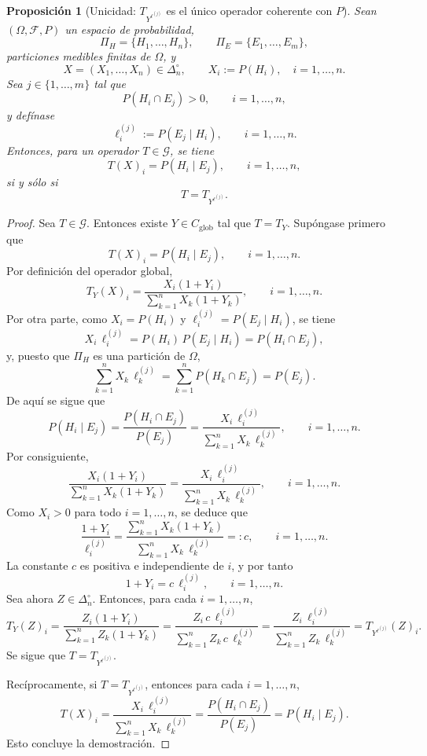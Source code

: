 \documentclass[12pt]{article}
\newtheorem{proposicion}{Proposición}[section]
\begin{document}
\begin{proposicion}[Unicidad: $T_{Y^{\ell^{(j)}}}$ es el único operador coherente con $P$]\label{prop:unicidad_bayes}
Sean $(\Omega,\mathcal F,P)$ un espacio de probabilidad,
\[
\Pi_H=\{H_1,\dots,H_n\},
\qquad
\Pi_E=\{E_1,\dots,E_m\},
\]
particiones medibles finitas de $\Omega$, y
\[
X=(X_1,\dots,X_n)\in\Delta_n^\circ,
\qquad
X_i:=P(H_i),\quad i=1,\dots,n.
\]
Sea $j\in\{1,\dots,m\}$ tal que
\[
P(H_i\cap E_j)>0,\qquad i=1,\dots,n,
\]
y defínase
\[
\ell_i^{(j)}:=P(E_j\mid H_i),\qquad i=1,\dots,n.
\]
Entonces, para un operador $T\in\mathcal G$, se tiene
\[
T(X)_i=P(H_i\mid E_j),\qquad i=1,\dots,n,
\]
si y sólo si
\[
T=T_{Y^{\ell^{(j)}}}.
\]
\end{proposicion}

\begin{proof}
Sea $T\in\mathcal G$. Entonces existe $Y\in C_{\mathrm{glob}}$ tal que $T=T_Y$. Supóngase primero que
\[
T(X)_i=P(H_i\mid E_j),\qquad i=1,\dots,n.
\]
Por definición del operador global,
\[
T_Y(X)_i
=
\frac{X_i(1+Y_i)}{\sum_{k=1}^n X_k(1+Y_k)},
\qquad i=1,\dots,n.
\]
Por otra parte, como $X_i=P(H_i)$ y $\ell_i^{(j)}=P(E_j\mid H_i)$, se tiene
\[
X_i\,\ell_i^{(j)}=P(H_i)\,P(E_j\mid H_i)=P(H_i\cap E_j),
\]
y, puesto que $\Pi_H$ es una partición de $\Omega$,
\[
\sum_{k=1}^n X_k\,\ell_k^{(j)}
=
\sum_{k=1}^n P(H_k\cap E_j)
=
P(E_j).
\]
De aquí se sigue que
\[
P(H_i\mid E_j)
=
\frac{P(H_i\cap E_j)}{P(E_j)}
=
\frac{X_i\,\ell_i^{(j)}}{\sum_{k=1}^n X_k\,\ell_k^{(j)}},
\qquad i=1,\dots,n.
\]
Por consiguiente,
\[
\frac{X_i(1+Y_i)}{\sum_{k=1}^n X_k(1+Y_k)}
=
\frac{X_i\,\ell_i^{(j)}}{\sum_{k=1}^n X_k\,\ell_k^{(j)}},
\qquad i=1,\dots,n.
\]
Como $X_i>0$ para todo $i=1,\dots,n$, se deduce que
\[
\frac{1+Y_i}{\ell_i^{(j)}}
=
\frac{\sum_{k=1}^n X_k(1+Y_k)}{\sum_{k=1}^n X_k\,\ell_k^{(j)}}
=:c,
\qquad i=1,\dots,n.
\]
La constante $c$ es positiva e independiente de $i$, y por tanto
\[
1+Y_i=c\,\ell_i^{(j)},\qquad i=1,\dots,n.
\]
Sea ahora $Z\in\Delta_n^\circ$. Entonces, para cada $i=1,\dots,n$,
\[
T_Y(Z)_i
=
\frac{Z_i(1+Y_i)}{\sum_{k=1}^n Z_k(1+Y_k)}
=
\frac{Z_i\,c\,\ell_i^{(j)}}{\sum_{k=1}^n Z_k\,c\,\ell_k^{(j)}}
=
\frac{Z_i\,\ell_i^{(j)}}{\sum_{k=1}^n Z_k\,\ell_k^{(j)}}
=
T_{Y^{\ell^{(j)}}}(Z)_i.
\]
Se sigue que $T=T_{Y^{\ell^{(j)}}}$.

Recíprocamente, si $T=T_{Y^{\ell^{(j)}}}$, entonces para cada $i=1,\dots,n$,
\[
T(X)_i
=
\frac{X_i\,\ell_i^{(j)}}{\sum_{k=1}^n X_k\,\ell_k^{(j)}}
=
\frac{P(H_i\cap E_j)}{P(E_j)}
=
P(H_i\mid E_j).
\]
Esto concluye la demostración.
\end{proof}
\end{document}
